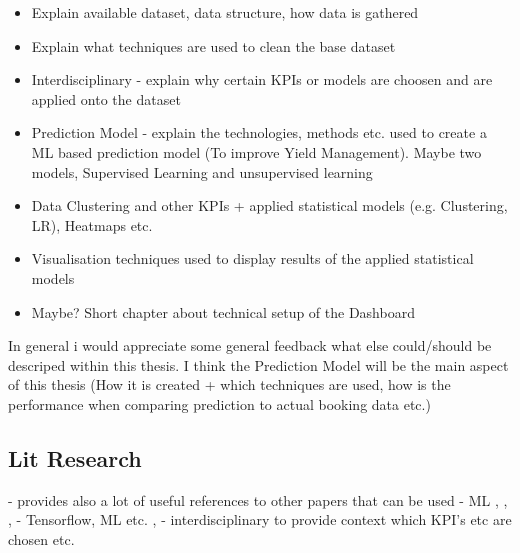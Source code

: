 \begin{itemize}
  \item Explain available dataset, data structure, how data is gathered 
  \item Explain what techniques are used to clean the base dataset
  \item Interdisciplinary - explain why certain KPIs or models are choosen and are applied onto the dataset 
  \item Prediction Model - explain the technologies, methods etc. used to create a ML based prediction model (To improve Yield Management). Maybe two models, Supervised Learning and unsupervised learning 
  \item Data Clustering and other KPIs + applied statistical models (e.g. Clustering, LR), Heatmaps etc. 
  \item Visualisation techniques used to display results of the applied statistical models 
  \item Maybe? Short chapter about technical setup of the Dashboard   
\end{itemize}
In general i would appreciate some general feedback what else could/should be descriped within this thesis. I think the Prediction Model will be the main aspect of this thesis (How it is created + which techniques are used, how is the performance when comparing prediction to actual booking data etc.) 




\subsection{Lit Research}
\cite{review_ml_styles} - provides also a lot of useful references to other papers that can be used 
\newline
\cite{prediction_stock_market} - ML 
\newline
\cite{hands_on_ML}, \cite{intro_ml}, \cite{tf_ctr},  \cite{bd_tf_price_forecasting} - Tensorflow, ML etc. 
\newline
\cite{kpi_imrpove_businiess}, \cite{kpi_imrpove_decision_making} - interdisciplinary to provide context which KPI's etc are chosen etc. 

